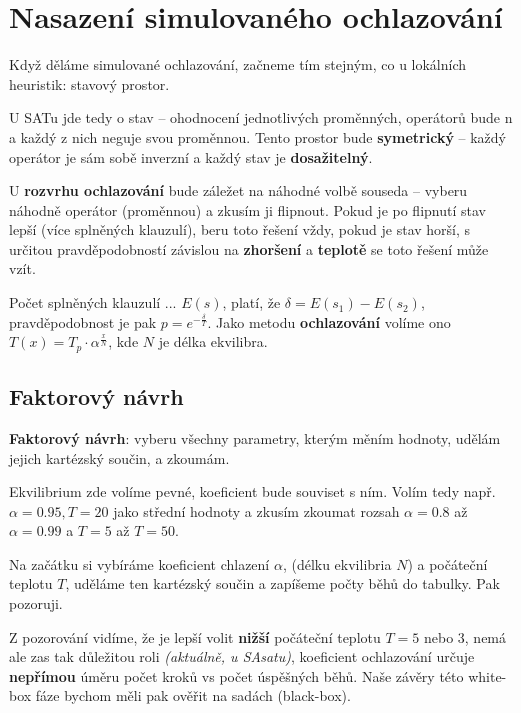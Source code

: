 \section{Nasazení simulovaného ochlazování}

Když děláme simulované ochlazování, začneme tím stejným, co u lokálních heuristik: stavový prostor.

\vspace{4pt}
\noindent U SATu jde tedy o stav -- ohodnocení jednotlivých proměnných, operátorů bude n a každý z nich neguje svou proměnnou. Tento prostor bude \textbf{symetrický} -- každý operátor je sám sobě inverzní a každý stav je \textbf{dosažitelný}.

\vspace{4pt}
\noindent U \textbf{rozvrhu ochlazování} bude záležet na náhodné volbě souseda -- vyberu náhodně operátor (proměnnou) a zkusím ji flipnout. Pokud je po flipnutí stav lepší (více splněných klauzulí), beru toto řešení vždy, pokud je stav horší, s určitou pravděpodobností závislou na \textbf{zhoršení} a \textbf{teplotě} se toto řešení může vzít.

\vspace{4pt}
\noindent Počet splněných klauzulí ... $E(s)$, platí, že $\delta = E(s_1) - E(s_2)$, pravděpodobnost je pak $p = e^{-\frac{\delta}{T}}$. Jako metodu \textbf{ochlazování} volíme ono $T(x) = T_p \cdot \alpha^{\frac{x}{N}}$, kde $N$ je délka ekvilibra.

\subsection{Faktorový návrh}

\textbf{Faktorový návrh}: vyberu všechny parametry, kterým měním hodnoty, udělám jejich kartézský součin, a zkoumám.

\vspace{4pt}
\noindent Ekvilibrium zde volíme pevné, koeficient bude souviset s ním. Volím tedy např. $\alpha = 0.95, T = 20$ jako střední hodnoty a zkusím zkoumat rozsah $\alpha = 0.8$ až $\alpha = 0.99$ a $T = 5$ až $T = 50$.

\vspace{4pt}
\noindent Na začátku si vybíráme koeficient chlazení $\alpha$, (délku ekvilibria $N$) a počáteční teplotu $T$, uděláme ten kartézský součin a zapíšeme počty běhů do tabulky. Pak pozoruji.

\vspace{4pt}
\noindent Z pozorování vidíme, že je lepší volit \textbf{nižší} počáteční teplotu $T = 5$ nebo 3, nemá ale zas tak důležitou roli \textit{(aktuálně, u SAsatu)}, koeficient ochlazování určuje \textbf{nepřímou} úměru počet kroků vs počet úspěšných běhů. Naše závěry této white-box fáze bychom měli pak ověřit na sadách (black-box).

